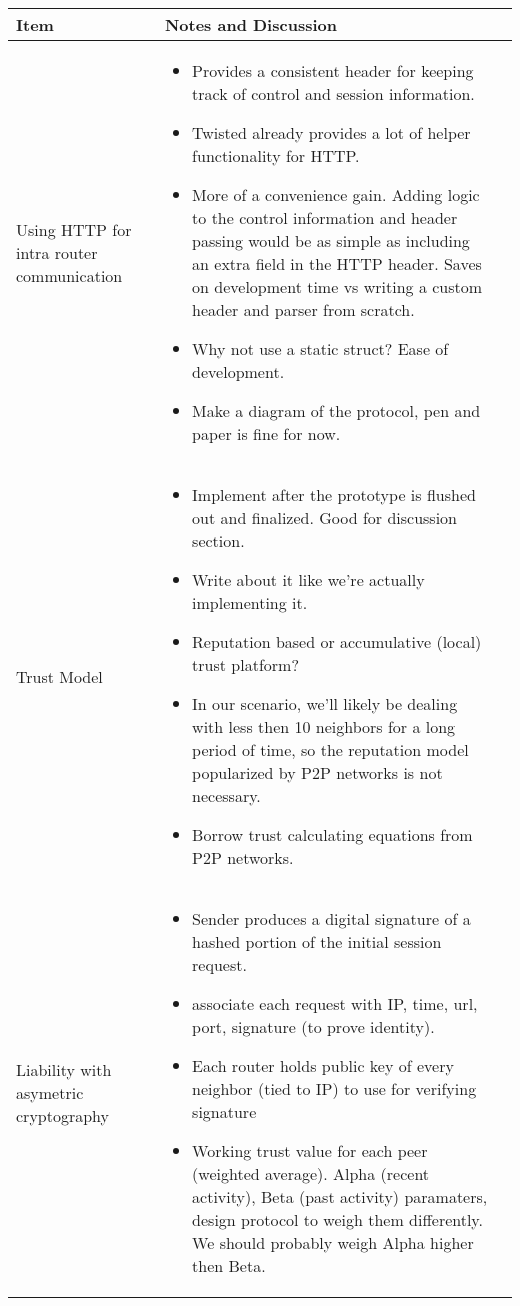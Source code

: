 \documentclass[a4wide,10pt]{extarticle}
\begin{document}
\vspace{0.5cm}
\begin{center}
\begin{tabular}{| m{3.0cm} | m{12.6cm} | m{2cm}|} \hline
\textbf{Item} & \textbf{Notes and Discussion}\\ \hline

Using HTTP for intra router communication & 
	\begin{itemize}
		\item Provides a consistent header for keeping track of control and session information.
		\item Twisted already provides a lot of helper functionality for HTTP.
		\item More of a convenience gain. Adding logic to the control information and header passing would be as simple as including an extra field in the HTTP header. Saves on development time vs writing a custom header and parser from scratch.
		\item Why not use a static struct? Ease of development. 
		\item Make a diagram of the protocol, pen and paper is fine for now.
	\end{itemize} 
\\ \hline

Trust Model &
	\begin{itemize}
		\item Implement after the prototype is flushed out and finalized. Good for discussion section.
		\item Write about it like we're actually implementing it.
		\item Reputation based or accumulative (local) trust platform?
		\item In our scenario, we'll likely be dealing with less then 10 neighbors for a long period of time, so the reputation model popularized by P2P networks is not necessary.
		\item Borrow trust calculating equations from P2P networks.
	\end{itemize}
\\ \hline

Liability with asymetric cryptography &
	\begin{itemize}
		\item Sender produces a digital signature of a hashed portion of the initial session request.
		\item associate each request with IP, time, url, port, signature (to prove identity).
		\item Each router holds public key of every neighbor (tied to IP) to use for verifying signature
		\item Working trust value for each peer (weighted average). Alpha (recent activity), Beta (past activity) paramaters, design protocol to weigh them differently. We should probably weigh Alpha higher then Beta.
	\end{itemize}
\\ \hline


\end{tabular}
\end{center}
\end{document}
